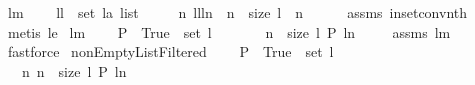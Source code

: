 \begin{isabellebody}
\ lm{}{}{}{\isacharcolon}\ \isanewline
\ \ \ {\isachardoublequoteopen}ll\ {\isasymin}\ set\ {\isacharparenleft}l{\isacharcolon}{\isacharcolon}{\isacharprime}a\ list{\isacharparenright}{\isachardoublequoteclose}\ \isanewline
\ \ \ {\isachardoublequoteopen}{\isasymexists}\ n{\isachardot}\ ll{\isacharequal}l{\isacharbang}n\ {\isacharampersand}\ n\ {\isacharless}\ size\ l\ {\isacharampersand}\ n\ {\isachargreater}{\isacharequal}\ {}{\isachardoublequoteclose}\isanewline
%
\isadelimproof
\ \ %
\endisadelimproof
%
\isatagproof
{}\isamarkupfalse%
\ assms\ in{\isacharunderscore}set{\isacharunderscore}conv{\isacharunderscore}nth\ \isamarkupfalse%
\ {\isacharparenleft}metis\ le{}{\isacharparenright}%
\endisatagproof
{\isafoldproof}%
%
\isadelimproof
\isanewline
%
\endisadelimproof
\isanewline
\isanewline
{}\isamarkupfalse%
\ lm{}{}{}{\isacharcolon}\ \isanewline
\ \ \ {\isachardoublequoteopen}P\ {\isacharminus}{\isacharbackquote}\ {\isacharbraceleft}True{\isacharbraceright}\ {\isasyminter}\ set\ l\ {\isasymnoteq}\ {\isacharbraceleft}{\isacharbraceright}{\isachardoublequoteclose}\ \isanewline
\ \ \ {\isachardoublequoteopen}{\isasymexists}\ n\ {\isasymin}\ {\isacharbraceleft}{}{\isachardot}{\isachardot}{\isacharless}size\ l{\isacharbraceright}{\isachardot}\ P\ {\isacharparenleft}l{\isacharbang}n{\isacharparenright}{\isachardoublequoteclose}\ \isanewline
%
\isadelimproof
\ \ %
\endisadelimproof
%
\isatagproof
{}\isamarkupfalse%
\ assms\ lm{}{}{}\ \isamarkupfalse%
\ fastforce%
\endisatagproof
{\isafoldproof}%
%
\isadelimproof
\isanewline
%
\endisadelimproof
\isanewline
\isanewline
{}\isamarkupfalse%
\ nonEmptyListFiltered{\isacharcolon}\ \isanewline
\ \ \ {\isachardoublequoteopen}P\ {\isacharminus}{\isacharbackquote}\ {\isacharbraceleft}True{\isacharbraceright}\ {\isasyminter}\ set\ l\ {\isasymnoteq}\ {\isacharbraceleft}{\isacharbraceright}{\isachardoublequoteclose}\ \isanewline
\ \ \ {\isachardoublequoteopen}{\isacharbrackleft}n{\isachardot}\ n\ {\isasymleftarrow}\ {\isacharbrackleft}{}{\isachardot}{\isachardot}{\isacharless}size\ l{\isacharbrackright}{\isacharcomma}\ P\ {\isacharparenleft}l{\isacharbang}n{\isacharparenright}{\isacharbrackright}\ {\isasymnoteq}\ {\isacharbrackleft}{\isacharbrackright}{\isachardoublequoteclose}\ \isanewline

\end{isabellebody}

